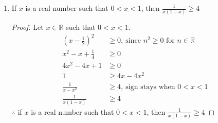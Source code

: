 \documentclass{article}
\newcommand{\bld}{\textbf}
\newcommand{\bb}{\mathbb}
\newcommand{\bitem}[1]{\item[\bld{#1.}]}
\begin{document}
\begin{enumerate}
  \bitem{d} If $x$ is a real number such that $0 < x < 1$, then $\frac{1}{x(1-x)} \geq 4$
  \begin{proof}
    Let $x \in \bb{R}$ such that $0 < x < 1$.
    \begin{align*}
      (x-\frac{1}{2})^2 & \geq 0,~\text{since $n^2 \geq 0$ for $n \in \bb{R}$} \\
      x^2-x+\frac{1}{4} & \geq 0                                               \\
      4x^2-4x+1         & \geq 0                                               \\
      1                 & \geq 4x - 4x^2                                       \\
      \frac{1}{x-x^2}   & \geq 4,~\text{sign stays when $0 < x < 1$}           \\
      \frac{1}{x(1-x)}  & \geq 4
    \end{align*}
    $\therefore$ if $x$ is a real number such that $0 < x < 1$, then $\frac{1}{x(1-x)} \geq 4$
  \end{proof}
\end{enumerate}
\end{document}
